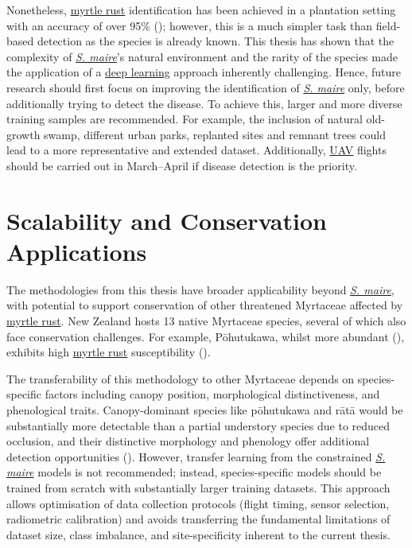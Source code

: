 \documentclass[
]{scrreprt}
\begin{document}
Nonetheless, \hyperref[acronyms_MR]{myrtle rust} identification has been
achieved in a plantation setting with an accuracy of over 95\%
();
however, this is a much simpler task than field-based detection as the
species is already known. This thesis has shown that the complexity of
\hyperref[acronyms_SM]{\emph{S. maire}}'s natural environment and the
rarity of the species made the application of a
\hyperref[acronyms_DL]{deep learning} approach inherently challenging.
Hence, future research should first focus on improving the
identification of \hyperref[acronyms_SM]{\emph{S. maire}} only, before
additionally trying to detect the disease. To achieve this, larger and
more diverse training samples are recommended. For example, the
inclusion of natural old-growth swamp, different urban parks, replanted
sites and remnant trees could lead to a more representative and extended
dataset. Additionally, \hyperref[acronyms_UAV]{UAV} flights should be
carried out in March--April if disease detection is the priority.

\section{Scalability and Conservation
Applications}\label{scalability-and-conservation-applications}

The methodologies from this thesis have broader applicability beyond
\hyperref[acronyms_SM]{\emph{S. maire}}, with potential to support
conservation of other threatened Myrtaceae affected by
\hyperref[acronyms_MR]{myrtle rust}. New Zealand hosts 13 native
Myrtaceae species, several of which also face conservation challenges.
For example, Pōhutukawa, whilst more abundant
(), exhibits
high \hyperref[acronyms_MR]{myrtle rust} susceptibility
().

The transferability of this methodology to other Myrtaceae depends on
species-specific factors including canopy position, morphological
distinctiveness, and phenological traits. Canopy-dominant species like
pōhutukawa and rātā would be substantially more detectable than a
partial understory species due to reduced occlusion, and their
distinctive morphology and phenology offer additional detection
opportunities (). However, transfer learning from the constrained
\hyperref[acronyms_SM]{\emph{S. maire}} models is not recommended;
instead, species-specific models should be trained from scratch with
substantially larger training datasets. This approach allows
optimisation of data collection protocols (flight timing, sensor
selection, radiometric calibration) and avoids transferring the
fundamental limitations of dataset size, class imbalance, and
site-specificity inherent to the current thesis.
\end{document}
